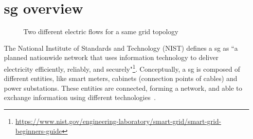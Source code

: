 \section[Smart grid overview]{\Gls{sg} overview}

\begin{figure}[ht]
	\centering
	\hfill
	\caption{Two different electric flows for a same grid topology}
	\label{fig:example:sg-overview:topo}
\end{figure}



The National Institute of Standards and Technology (NIST) defines a \gls{sg} as ``a planned nationwide network that uses information technology to deliver electricity efficiently, reliably, and securely"\footnote{\url{https://www.nist.gov/engineering-laboratory/smart-grid/smart-grid-beginners-guide}}.
Conceptually, a \gls{sg} is composed of different entities, like smart meters, cabinets (connection points of cables) and power substations.
These entities are connected, forming a network, and able to exchange information using different technologies~\cite{DBLP:conf/smartgridcomm/0001FKTPTR14, DBLP:conf/sac/0001MFRKT16}.

